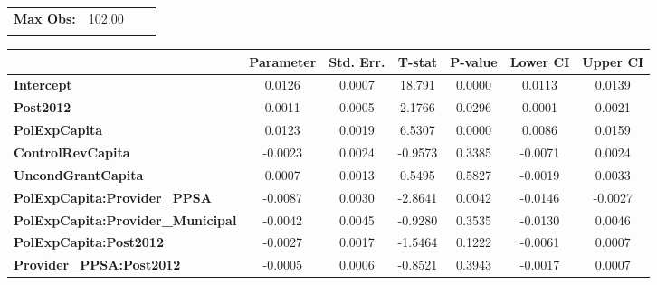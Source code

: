 \begin{center}
\begin{tabular}{lclc}
\textbf{Max Obs:}                                  &       102.00       & \textbf{                     }   &                  \\
\textbf{}                                          &                    & \textbf{                     }   &                  \\
\bottomrule
\end{tabular}
\begin{tabular}{lcccccc}
                                                   & \textbf{Parameter} & \textbf{Std. Err.} & \textbf{T-stat} & \textbf{P-value} & \textbf{Lower CI} & \textbf{Upper CI}  \\
\midrule
\textbf{Intercept}                                 &       0.0126       &       0.0007       &      18.791     &      0.0000      &       0.0113      &       0.0139       \\
\textbf{Post2012}                                  &       0.0011       &       0.0005       &      2.1766     &      0.0296      &       0.0001      &       0.0021       \\
\textbf{PolExpCapita}                              &       0.0123       &       0.0019       &      6.5307     &      0.0000      &       0.0086      &       0.0159       \\
\textbf{ControlRevCapita}                          &      -0.0023       &       0.0024       &     -0.9573     &      0.3385      &      -0.0071      &       0.0024       \\
\textbf{UncondGrantCapita}                         &       0.0007       &       0.0013       &      0.5495     &      0.5827      &      -0.0019      &       0.0033       \\
\textbf{PolExpCapita:Provider\_PPSA}               &      -0.0087       &       0.0030       &     -2.8641     &      0.0042      &      -0.0146      &      -0.0027       \\
\textbf{PolExpCapita:Provider\_Municipal}          &      -0.0042       &       0.0045       &     -0.9280     &      0.3535      &      -0.0130      &       0.0046       \\
\textbf{PolExpCapita:Post2012}                     &      -0.0027       &       0.0017       &     -1.5464     &      0.1222      &      -0.0061      &       0.0007       \\
\textbf{Provider\_PPSA:Post2012}                   &      -0.0005       &       0.0006       &     -0.8521     &      0.3943      &      -0.0017      &       0.0007       \\

\end{tabular}
\end{center}
